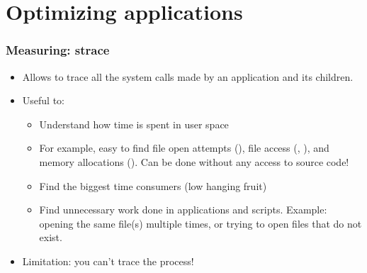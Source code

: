 \section{Optimizing applications}

\begin{frame}
\frametitle{Measuring: strace}
\begin{itemize}
        \item Allows to trace all the system calls made by an
              application and its children.
        \item Useful to:
        \begin{itemize}
                \item Understand how time is spent in user space
                \item For example, easy to find file open attempts (),
                      file access (, ), and
                      memory allocations (). Can be done
                      without any access to source code!
                \item Find the biggest time consumers
                      (low hanging fruit)
                \item Find unnecessary work done in applications
                      and scripts. Example: opening the same file(s)
                      multiple times, or trying to open files that
                      do not exist.
        \end{itemize}
        \item Limitation: you can't trace the  process!
\end{itemize}
\end{frame}





